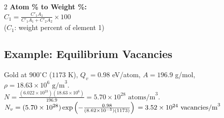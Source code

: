 \documentclass[8pt]{article}
\begin{document}
\begin{multicols*}{2}
  \textbf{Atom \% to Weight \%:} \\
  \( C_{1} = \frac{C'_{1} A_{1}}{C'_{1} A_{1} + C'_{2} A_{2}} \times 100 \)  \\
  (\( C_{1} \): weight percent of element 1)

  \subsection*{Example: Equilibrium Vacancies}
  Gold at \( 900^\circ\text{C} \) (\( 1173 \) K), \( Q_v = 0.98 \) eV/atom, \( A = 196.9 \) g/mol, \( \rho = 18.63 \times 10^6 \text{ g/m}^3 \). \\
  \( N = \frac{(6.022 \times 10^{23})(18.63 \times 10^{6})}{196.9} = 5.70 \times 10^{28} \text{ atoms/m}^3 \). \\
  \( N_v = (5.70 \times 10^{28}) \exp\left(-\frac{0.98}{(8.62 \times 10^{-5})(1173)}\right) \\ = 3.52 \times 10^{24} \text{ vacancies/m}^3 \)

\end{multicols*}
\end{document}
